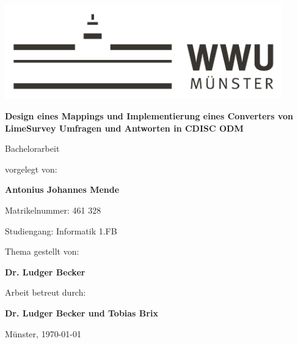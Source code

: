 \begin{centering}
\vspace*{\fill}
\includegraphics[width=12cm]{./img/wwu-logo-neu.pdf}

\vspace{2cm} 

{\Large
	\textbf{Design eines Mappings und Implementierung eines Converters von LimeSurvey Umfragen und Antworten in CDISC ODM}\\[1.2cm]
}

{\large
	Bachelorarbeit\\[2cm]
}

{\large
	vorgelegt von:
}

{ \Large
	\textbf{Antonius Johannes Mende}\\[1cm]
}

{\large
	Matrikelnummer: 461 328\\[2mm]
}

{\large
	Studiengang: Informatik 1.FB\\[1cm]
}
    
{\large
	Thema gestellt von:
}

{\Large
	\textbf{Dr. Ludger Becker}\\[1cm]
}
                               
{\large
	Arbeit betreut durch:
}

{\Large
	\textbf{Dr. Ludger Becker und Tobias Brix}\\[1cm]
}

{\large
Münster, \today
}
\vfill
\end{centering}
